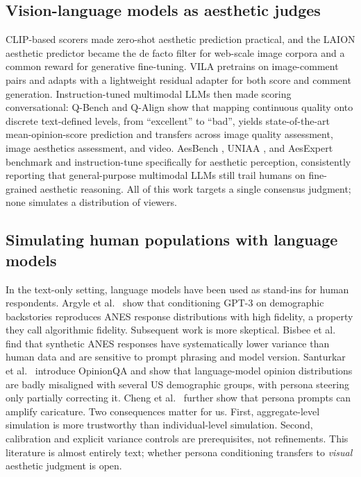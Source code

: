 \documentclass{article}
\begin{document}
\subsection{Vision-language models as aesthetic judges}
CLIP-based scorers made zero-shot aesthetic prediction practical, and the LAION aesthetic predictor \citep{schuhmann2022} became the de facto filter for web-scale image corpora and a common reward for generative fine-tuning. VILA \citep{ke2023vila} pretrains on image-comment pairs and adapts with a lightweight residual adapter for both score and comment generation. Instruction-tuned multimodal LLMs then made scoring conversational: Q-Bench \citep{wu2024qbench} and Q-Align \citep{wu2024qalign} show that mapping continuous quality onto discrete text-defined levels, from ``excellent'' to ``bad'', yields state-of-the-art mean-opinion-score prediction and transfers across image quality assessment, image aesthetics assessment, and video. AesBench \citep{huang2024aesbench}, UNIAA \citep{zhou2024uniaa}, and AesExpert \citep{huang2024aesexpert} benchmark and instruction-tune specifically for aesthetic perception, consistently reporting that general-purpose multimodal LLMs still trail humans on fine-grained aesthetic reasoning. All of this work targets a single consensus judgment; none simulates a distribution of viewers.

\subsection{Simulating human populations with language models}
In the text-only setting, language models have been used as stand-ins for human respondents. Argyle et al.\ \citep{argyle2023} show that conditioning GPT-3 on demographic backstories reproduces ANES response distributions with high fidelity, a property they call algorithmic fidelity. Subsequent work is more skeptical. Bisbee et al.\ \citep{bisbee2024synthetic} find that synthetic ANES responses have systematically lower variance than human data and are sensitive to prompt phrasing and model version. Santurkar et al.\ \citep{santurkar2023whose} introduce OpinionQA and show that language-model opinion distributions are badly misaligned with several US demographic groups, with persona steering only partially correcting it. Cheng et al.\ \citep{cheng2023compost} further show that persona prompts can amplify caricature. Two consequences matter for us. First, aggregate-level simulation is more trustworthy than individual-level simulation. Second, calibration and explicit variance controls are prerequisites, not refinements. This literature is almost entirely text; whether persona conditioning transfers to \emph{visual} aesthetic judgment is open.
\end{document}
